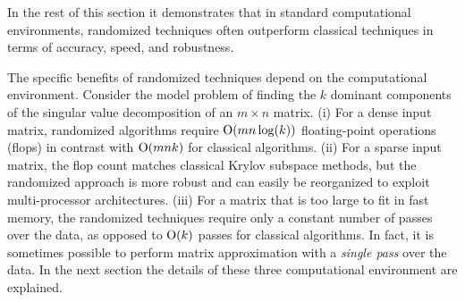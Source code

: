 \documentclass{article}
\begin{document}
\begin{figure}
\begin{center}
\end{center}
\end{figure}

In the rest of this section it demonstrates that in standard computational environments, randomized
techniques often outperform classical techniques in terms of
accuracy, speed, and robustness.


The specific benefits of randomized techniques depend on the
computational environment. Consider the model problem of finding
the $k$ dominant components of the singular value decomposition
of an $m \times n$ matrix.
(i) For a dense input matrix, randomized algorithms require $\mathrm{O}(mn
\log(k))$ floating-point operations (flops) in contrast with $
\mathrm{O}(mnk)$ for classical algorithms.
%
(ii) For a sparse input matrix, the flop count matches classical
Krylov subspace methods, but the randomized approach is more robust
and can easily be reorganized to exploit multi-processor architectures.
(iii) For a matrix that is too large to fit in fast memory, the randomized
techniques require only a constant number of passes over the data,
as opposed to $\mathrm{O}(k)$ passes for classical algorithms.
In fact, it is sometimes possible to perform matrix approximation with a
\emph{single pass} over the data. In the next section the details of these three computational environment are explained.
\end{document}
